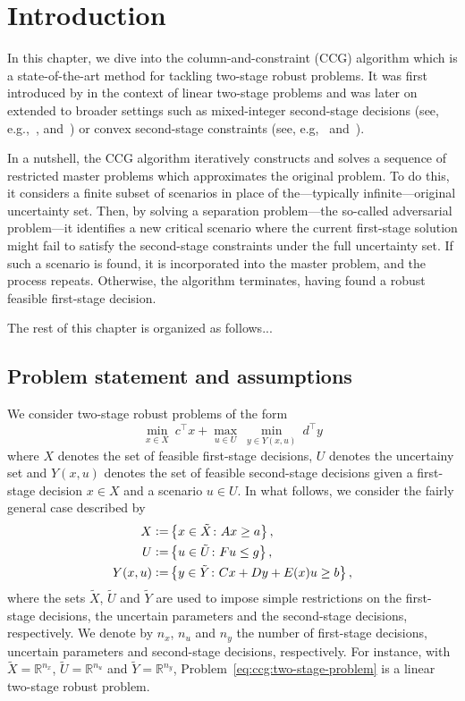 \section{Introduction}

In this chapter, we dive into the column-and-constraint (CCG) algorithm which
is a state-of-the-art method for tackling two-stage robust problems. It was
first introduced by \textcite{Zeng2013} in the context of linear two-stage
problems and was later on extended to broader settings such as mixed-integer
second-stage decisions (see, e.g.,~\cite{zeng2012exact},
\cite{Subramanyam2022} and~\cite{lefebvre2025correctiontolagrangiandual}) or
convex second-stage constraints (see, e.g,~\cite{khademi2022dual}
and~\cite{lefebvre2022convex}).

In a nutshell, the CCG algorithm iteratively constructs and solves a sequence
of restricted master problems which approximates the original problem. To do
this, it considers a finite subset of scenarios in place of the---typically
infinite---original uncertainty set. Then, by solving a separation
problem---the so-called adversarial problem---it identifies a new critical
scenario where the current first-stage solution might fail to satisfy the
second-stage constraints under the full uncertainty set. If such a scenario is
found, it is incorporated into the master problem, and the process repeats.
Otherwise, the algorithm terminates, having found a robust feasible
first-stage decision.

The rest of this chapter is organized as follows...

\subsection{Problem statement and assumptions}
We consider two-stage robust problems of the form
\begin{equation}
    \label{eq:ccg:two-stage-problem}
    \min_{x\in X} \ c^\top x + \max_{ u\in U } \ \min_{y\in Y(x,u)} \ d^\top y
\end{equation}
where $X$ denotes the set of feasible first-stage decisions, $U$ denotes the
uncertainy set and $Y(x,u)$ denotes the set of feasible second-stage decisions
given a first-stage decision $x\in X$ and a scenario $u\in U$. In what
follows, we consider the fairly general case described by 
\begin{align*}
    X \mathrel{{\mathop:}{=}} & \left\{ x\in \tilde{X} \colon Ax \ge a \right\}, \\
    U \mathrel{{\mathop:}{=}} & \left\{ u\in\tilde{U} \colon Fu \le g \right\}, \\
    Y(x,u) \mathrel{{\mathop:}{=}} & \left\{ y\in \tilde{Y} \colon Cx + Dy + E(x)u \ge b \right\},
\end{align*}
where the sets $\tilde{X}$, $\tilde{U}$ and $\tilde{Y}$ are used to impose
simple restrictions on the first-stage decisions, the uncertain parameters and
the second-stage decisions, respectively. We denote by $n_x$, $n_u$ and $n_y$
the number of first-stage decisions, uncertain parameters and second-stage
decisions, respectively. For instance, with $\tilde{X} = \mathbb{R}^{n_x}$,
$\tilde{U} = \mathbb{R}^{n_u}$ and $\tilde{Y} = \mathbb{R}^{n_y}$,
Problem~\eqref{eq:ccg:two-stage-problem} is a linear two-stage robust problem.

